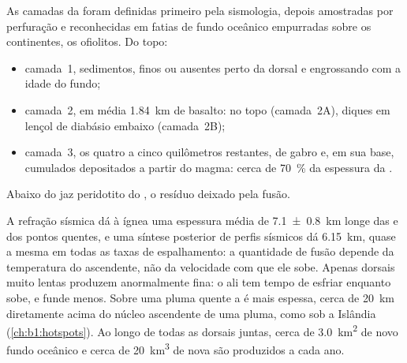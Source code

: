 As camadas da  foram definidas primeiro pela sismologia, depois amostradas por perfuração e reconhecidas em fatias de fundo oceânico empurradas sobre os continentes, os ofiolitos. Do topo:
\begin{itemize}
  \item camada~1, sedimentos, finos ou ausentes perto da dorsal e engrossando com
        a idade do fundo;
  \item camada~2, em média \qty{1.84}{km} de basalto:  no topo
        (camada~2A), diques em lençol de diabásio embaixo (camada~2B);
  \item camada~3, os quatro a cinco quilômetros restantes, de gabro e, em sua base, cumulados depositados a partir do magma: cerca de \qty{70}{\percent} da
        espessura da .
\end{itemize}
Abaixo do  jaz peridotito do , o resíduo deixado pela fusão.

A refração sísmica dá à  ígnea uma espessura média de
\qty[uncertainty-mode=separate]{7.1 \pm 0.8}{km} longe das  e dos pontos quentes, e uma síntese posterior de perfis sísmicos dá \qty{6.15}{km}, quase a mesma em todas as taxas de espalhamento: a quantidade de fusão depende da temperatura do  ascendente, não da velocidade com que ele sobe. Apenas dorsais muito lentas produzem  anormalmente fina: o  ali tem tempo de esfriar enquanto sobe, e funde menos. Sobre uma pluma quente a  é mais espessa, cerca de \qty{20}{km} diretamente acima do núcleo ascendente de uma pluma, como sob a Islândia (\cref{ch:b1:hotspots}). Ao longo de todas as dorsais juntas, cerca de \qty{3.0}{km^2} de novo fundo oceânico e cerca de \qty{20}{km^3} de nova  são produzidos a cada ano.

